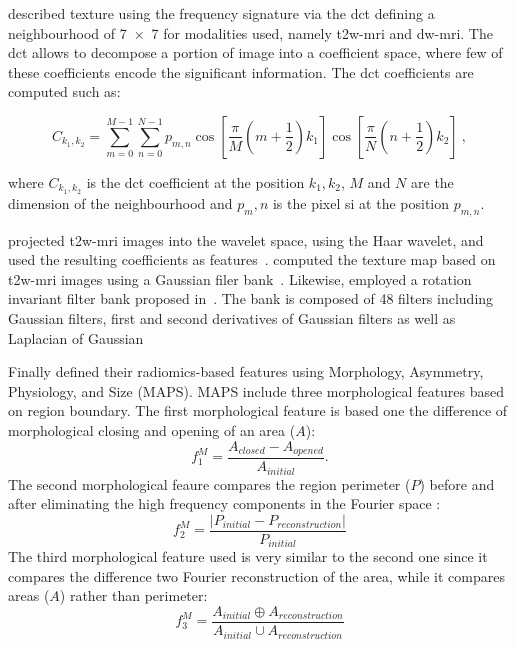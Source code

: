 \citeauthor{Chan2003} described texture using the frequency signature via the \acf{dct}\cite{Ahmed1974} defining a neighbourhood of \SI[product-units=repeat]{7x7}{\px} for modalities used, namely \ac{t2w}-\ac{mri} and \ac{dw}-\ac{mri}.
The \ac{dct} allows to decompose a portion of image into a coefficient space, where few of these coefficients encode the significant information.
The \ac{dct} coefficients are computed such as:

\begin{equation}
	C_{k_1,k_2} = \sum_{m=0}^{M-1} \sum_{n=0}^{N-1} p_{m,n} \cos \left[ \frac{\pi}{M} \left( m + \frac{1}{2} \right) k_1 \right] \cos \left[ \frac{\pi}{N} \left( n + \frac{1}{2} \right) k_2 \right] \ ,
\end{equation}

\noindent where $C_{k_1,k_2}$ is the \ac{dct} coefficient at the position $k_1,k_2$, $M$ and $N$ are the dimension of the neighbourhood and $p_m,n$ is the pixel \ac{si} at the position $p_{m,n}$.

\citeauthor{Viswanath2012} projected \ac{t2w}-\ac{mri} images into the wavelet space, using the Haar wavelet, and used the resulting coefficients as features~\cite{Viswanath2012}.
\citeauthor{Litjens2011} computed the texture map based on \ac{t2w}-\ac{mri} images using a Gaussian filer bank~\cite{Litjens2011}.
Likewise, \citeauthor{rampun2016computer} employed a rotation invariant filter bank proposed in~\cite{leung2001representing}.
The bank is composed of 48 filters including Gaussian filters, first and second derivatives of Gaussian filters as well as Laplacian of Gaussian

Finally \citeauthor{cameron2016maps} defined their radiomics-based features using Morphology, Asymmetry, Physiology, and Size (MAPS).
MAPS include three morphological features based on region boundary. 
The first morphological feature is based one the difference of morphological closing and opening of an area ($A$): 
\begin{equation}
  f^{M}_{1} = \frac{A_{closed} - A_{opened}}{A_{initial}}.
\end{equation} 
The second morphological feaure compares the region perimeter ($P$) before and after eliminating the high frequency components in the Fourier space \cite{cameron2016maps}: 
\begin{equation}
  f^{M}_{2} = \frac{\vert P_{initial} - P_{reconstruction} \vert}{P_{initial}}
\end{equation}
The third morphological feature used is very similar to the second one since it compares the difference two Fourier reconstruction of the area, while it compares areas ($A$) rather than perimeter:
\begin{equation}
  f^{M}_{3} = \frac{A_{initial} \oplus A_{reconstruction}}{ A_{initial} \cup A_{reconstruction}}
\end{equation}

